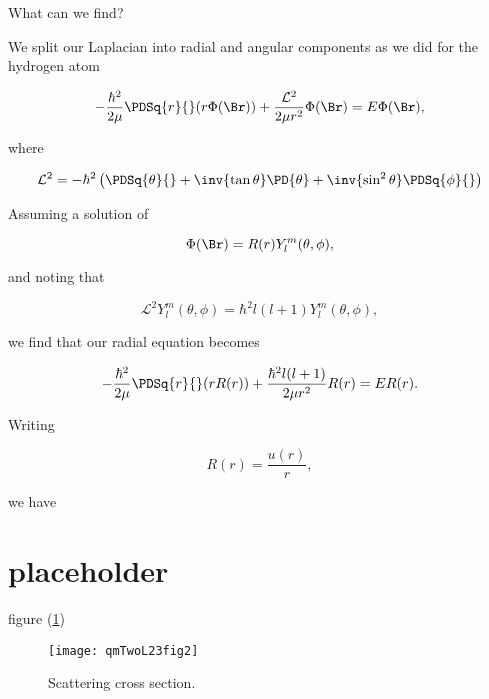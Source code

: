 What can we find?

We split our Laplacian into radial and angular components as we did for the hydrogen atom

\begin{equation}\label{eqn:qmTwoL23:n}
- \frac{\hbar^2}{2\mu} \PDSq{r}{} (r \Phi(\Br)) +
\frac{\mathcal{L}^2}{2 \mu r^2} 
\Phi(\Br)
= 
E \Phi(\Br),
\end{equation}

where 

\begin{equation}\label{eqn:qmTwoL23:n}
\mathcal{L}^2 = -\hbar^2 \left(
\PDSq{\theta}{}
+ \inv{\tan\theta} \PD{\theta}
+ \inv{\sin^2\theta} \PDSq{\phi}{}
\right)
\end{equation}

Assuming a solution of

\begin{equation}\label{eqn:qmTwoL23:n}
\Phi(\Br) = R(r) Y_l^m(\theta, \phi),
\end{equation}

and noting that

\begin{equation}\label{eqn:qmTwoL23:n}
\mathcal{L}^2 Y_l^m(\theta, \phi) = \hbar^2 l (l+1) Y_l^m(\theta, \phi),
\end{equation}

we find that our radial equation becomes

\begin{equation}\label{eqn:qmTwoL23:n}
- \frac{\hbar^2}{2\mu} \PDSq{r}{} (r R(r))
+\frac{\hbar^2 l (l+1) 
}{2 \mu r^2} 
R(r)
= 
E R(r).
\end{equation}

Writing

\begin{equation}\label{eqn:qmTwoL23:n}
R(r) = \frac{u(r)}{r},
\end{equation}

we have

\section{placeholder}

figure (\ref{fig:qmTwoL23:qmTwoL23fig2})

\begin{figure}[htp]
   \centering
   \texttt{[image: qmTwoL23fig2]}
   \caption{Scattering cross section.}\label{fig:qmTwoL23:qmTwoL23fig2}
\end{figure}

\EndArticle
